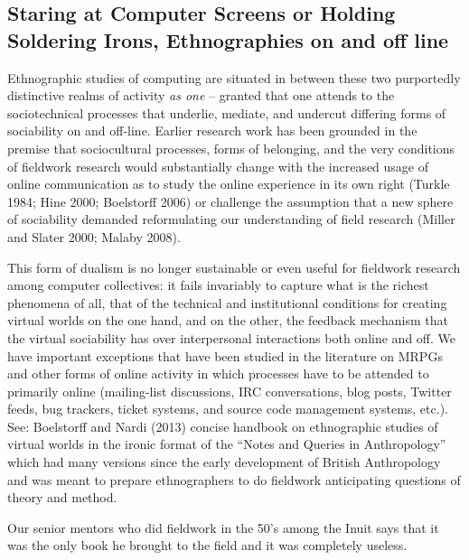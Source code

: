\documentclass[10pt,letter,oneside]{scrartcl}
\begin{document}
\subsection{Staring at Computer Screens
  or Holding Soldering Irons, Ethnographies on and off line}

Ethnographic studies of computing are situated in between these two
purportedly distinctive realms of activity \emph{as one} -- granted
that one attends to the sociotechnical processes that underlie,
mediate, and undercut differing forms of sociability on and
off-line. Earlier research work has been grounded in the premise that
sociocultural processes, forms of belonging, and the very conditions
of fieldwork research would substantially change with the increased
usage of online communication as to study the online experience in its
own right (Turkle 1984; Hine 2000; Boelstorff 2006) or challenge the
assumption that a new sphere of sociability demanded reformulating our
understanding of field research (Miller and Slater 2000; Malaby
2008).


This form of dualism is no longer sustainable or even useful for
fieldwork research among computer collectives: it fails invariably to
capture what is the richest phenomena of all, that of the technical
and institutional conditions for creating virtual worlds on the one
hand, and on the other, the feedback mechanism that the virtual
sociability has over interpersonal interactions both online and off.
We have important exceptions that have been studied in the literature
on MRPGs and other forms of online activity in which processes have to
be attended to primarily online (mailing-list discussions, IRC
conversations, blog posts, Twitter feeds, bug trackers, ticket
systems, and source code management systems, etc.). See: Boelstorff
and Nardi (2013) concise handbook on ethnographic studies of virtual
worlds in the ironic format of the ``Notes and Queries in
Anthropology'' which had many versions since the early development of
British Anthropology and was meant to prepare ethnographers to do
fieldwork anticipating questions of theory and method. 

Our senior mentors who did fieldwork in the 50's among the Inuit says
that it was the only book he brought to the field and it was
completely useless.  %


\end{document}
